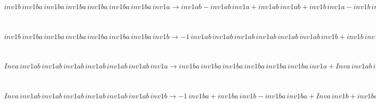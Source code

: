\documentclass[rep10,leqno]{report}
\begin{document}
\begin{minipage}{6in}
$
inv1b\,
 inv1ba\,
 inv1ba\,
 inv1ba\,
 inv1ba\,
 inv1ba\,
 inv1ba\,
 inv1a\rightarrow inv1ab - inv1ab\,
 inv1a + inv1ab\,
 inv1ab + inv1b\,
 inv1a - inv1b\,
 inv1ab - inv1ab\,
 inv1ab\,
 inv1a + inv1ab\,
 inv1ab\,
 inv1ab + inv1b\,
 inv1ab\,
 inv1a - inv1b\,
 inv1ab\,
 inv1ab - inv1ab\,
 inv1ab\,
 inv1ab\,
 inv1a + inv1ab\,
 inv1ab\,
 inv1ab\,
 inv1ab + inv1b\,
 inv1ab\,
 inv1ab\,
 inv1a - inv1b\,
 inv1ab\,
 inv1ab\,
 inv1ab - inv1ab\,
 inv1ab\,
 inv1ab\,
 inv1ab\,
 inv1a + inv1ab\,
 inv1ab\,
 inv1ab\,
 inv1ab\,
 inv1ab + inv1b\,
 inv1ab\,
 inv1ab\,
 inv1ab\,
 inv1a - inv1b\,
 inv1ab\,
 inv1ab\,
 inv1ab\,
 inv1ab - inv1ab\,
 inv1ab\,
 inv1ab\,
 inv1ab\,
 inv1ab\,
 inv1a + inv1ab\,
 inv1ab\,
 inv1ab\,
 inv1ab\,
 inv1ab\,
 inv1ab + inv1b\,
 inv1ab\,
 inv1ab\,
 inv1ab\,
 inv1ab\,
 inv1a - inv1b\,
 inv1ab\,
 inv1ab\,
 inv1ab\,
 inv1ab\,
 inv1ab - inv1ab\,
 inv1ab\,
 inv1ab\,
 inv1ab\,
 inv1ab\,
 inv1ab\,
 inv1a + inv1b\,
 inv1ab\,
 inv1ab\,
 inv1ab\,
 inv1ab\,
 inv1ab\,
 inv1a - inv1b\,
 inv1ab\,
 inv1ab\,
 inv1ab\,
 inv1ab\,
 inv1ab\,
 inv1ab + inv1b\,
 inv1ab\,
 inv1ab\,
 inv1ab\,
 inv1ab\,
 inv1ab\,
 inv1ab\,
 inv1a
$
\end{minipage}\medskip \\
\begin{minipage}{6in}
$
inv1b\,
 inv1ba\,
 inv1ba\,
 inv1ba\,
 inv1ba\,
 inv1ba\,
 inv1ba\,
 inv1b\rightarrow -1\,
 inv1ab\,
 inv1ab\,
 inv1ab\,
 inv1ab\,
 inv1ab\,
 inv1ab\,
 inv1b + inv1b\,
 inv1ba\,
 inv1ba\,
 inv1ba\,
 inv1ba\,
 inv1ba\,
 inv1ba + inv1b\,
 inv1ab\,
 inv1ab\,
 inv1ab\,
 inv1ab\,
 inv1ab\,
 inv1ab\,
 inv1b
$
\end{minipage}\medskip \\
\begin{minipage}{6in}
$
Inva\,
 inv1ab\,
 inv1ab\,
 inv1ab\,
 inv1ab\,
 inv1ab\,
 inv1ab\,
 inv1a\rightarrow inv1ba\,
 inv1ba\,
 inv1ba\,
 inv1ba\,
 inv1ba\,
 inv1ba\,
 inv1a + Inva\,
 inv1ab\,
 inv1ab\,
 inv1ab\,
 inv1ab\,
 inv1ab\,
 inv1ab
$
\end{minipage}\medskip \\
\begin{minipage}{6in}
$
Inva\,
 inv1ab\,
 inv1ab\,
 inv1ab\,
 inv1ab\,
 inv1ab\,
 inv1ab\,
 inv1b\rightarrow -1\,
 inv1ba + inv1ba\,
 inv1b - inv1ba\,
 inv1ba + Inva\,
 inv1b + inv1ba\,
 inv1ba\,
 inv1b - inv1ba\,
 inv1ba\,
 inv1ba + inv1ba\,
 inv1ba\,
 inv1ba\,
 inv1b - inv1ba\,
 inv1ba\,
 inv1ba\,
 inv1ba + inv1ba\,
 inv1ba\,
 inv1ba\,
 inv1ba\,
 inv1b - inv1ba\,
 inv1ba\,
 inv1ba\,
 inv1ba\,
 inv1ba + inv1ba\,
 inv1ba\,
 inv1ba\,
 inv1ba\,
 inv1ba\,
 inv1b - inv1ba\,
 inv1ba\,
 inv1ba\,
 inv1ba\,
 inv1ba\,
 inv1ba + inv1ba\,
 inv1ba\,
 inv1ba\,
 inv1ba\,
 inv1ba\,
 inv1ba\,
 inv1b
$
\end{minipage}\medskip \\
\end{document}
